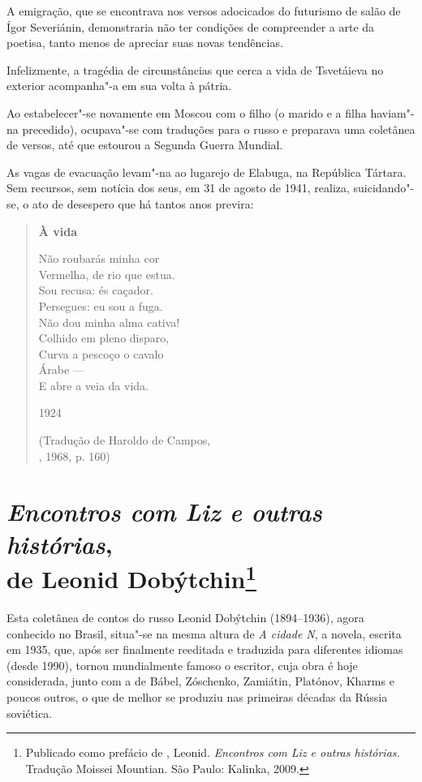 A emigração, que se encontrava nos versos adocicados do
futurismo de salão de Ígor Severiánin, demonstraria não ter
condições de compreender a arte da poetisa, tanto menos de
apreciar suas novas tendências.

Infelizmente, a tragédia de circunstâncias que cerca a vida de
Tsvetáieva no exterior acompanha"-a em sua volta à pátria.

Ao estabelecer"-se novamente em Moscou com o filho (o marido e a
filha haviam"-na precedido), ocupava"-se com traduções para o
russo e preparava uma coletânea de versos, até que estourou a
Segunda Guerra Mundial.

As vagas de evacuação levam"-na ao lugarejo de Elabuga, na
República Tártara. Sem recursos, sem notícia dos seus, em 31
de agosto de 1941, realiza, suicidando"-se, o ato de desespero
que há tantos anos previra:

\pagebreak

\begin{verse}
\textbf{À vida}

Não roubarás minha cor \\
Vermelha, de rio que estua. \\
Sou recusa: és caçador. \\
Persegues: eu sou a fuga. \\[8pt]
Não dou minha alma cativa! \\
Colhido em pleno disparo, \\
Curva a pescoço o cavalo \\
Árabe --- \\
E abre a veia da vida. 

1924

(Tradução de Haroldo de Campos,\\
, 1968, p. 160)

\end{verse}

\chapter{\emph{Encontros com Liz e outras histórias},\\
de Leonid Dobýtchin\footnote{Publicado como prefácio de \protect{},
Leonid. \emph{Encontros com Liz e outras histórias.} Tradução
Moissei Mountian. São Paulo: Kalinka, 2009.}}
\label{liz}

Esta coletânea de contos do russo Leonid Dobýtchin (1894--1936), agora
conhecido no Brasil, situa"-se na mesma altura de \emph{A cidade N}, a
novela, escrita em 1935, que, após ser finalmente reeditada e traduzida
para diferentes idiomas (desde 1990), tornou mundialmente famoso o
escritor, cuja obra é hoje considerada, junto com a de Bábel, Zóschenko,
Zamiátin, Platónov, Kharms e poucos outros, o que de melhor se produziu
nas primeiras décadas da Rússia soviética.

